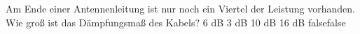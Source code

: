     {Am Ende einer Antennenleitung ist nur noch ein Viertel der Leistung vorhanden. Wie groß ist das Dämpfungsmaß des Kabels?}
    {6 dB}
    {3 dB}
    {10 dB}
    {16 dB}
    {false}{false}